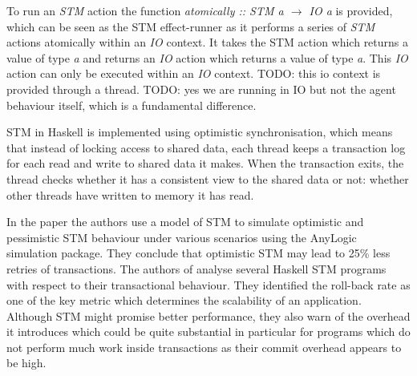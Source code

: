 To run an \textit{STM} action the function \textit{atomically :: STM a $\to$ IO a} is provided, which can be seen as the STM effect-runner as it performs a series of \textit{STM} actions atomically within an \textit{IO} context. It takes the STM action which returns a value of type \textit{a} and returns an \textit{IO} action which returns a value of type \textit{a}. This \textit{IO} action can only be executed within an \textit{IO} context. TODO: this io context is provided through a thread. TODO: yes we are running in IO but not the agent behaviour itself, which is a fundamental difference.

STM in Haskell is implemented using optimistic synchronisation, which means that instead of locking access to shared data, each thread keeps a transaction log for each read and write to shared data it makes. When the transaction exits, the thread checks whether it has a consistent view to the shared data or not: whether other threads have written to memory it has read. %

In the paper \cite{heindl_modeling_2009} the authors use a model of STM to simulate optimistic and pessimistic STM behaviour under various scenarios using the AnyLogic simulation package. They conclude that optimistic STM may lead to 25\% less retries of transactions. The authors of \cite{perfumo_limits_2008} analyse several Haskell STM programs with respect to their transactional behaviour. They identified the roll-back rate as one of the key metric which determines the scalability of an application. Although STM might promise better performance, they also warn of the overhead it introduces which could be quite substantial in particular for programs which do not perform much work inside transactions as their commit overhead appears to be high.